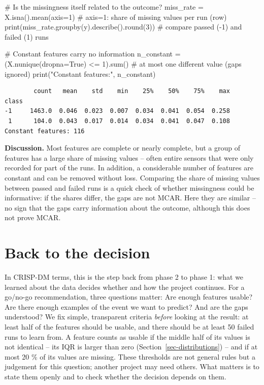 \documentclass[
  letterpaper,
  DIV=11,
  numbers=noendperiod]{scrreprt}
\newenvironment{Shaded}{\begin{snugshade}}{\end{snugshade}}
\newcommand{\BuiltInTok}[1]{\textcolor[rgb]{0.00,0.23,0.31}{#1}}
\newcommand{\CommentTok}[1]{\textcolor[rgb]{0.37,0.37,0.37}{#1}}
\newcommand{\DecValTok}[1]{\textcolor[rgb]{0.68,0.00,0.00}{#1}}
\newcommand{\NormalTok}[1]{\textcolor[rgb]{0.00,0.23,0.31}{#1}}
\newcommand{\OperatorTok}[1]{\textcolor[rgb]{0.37,0.37,0.37}{#1}}
\newcommand{\StringTok}[1]{\textcolor[rgb]{0.13,0.47,0.30}{#1}}
\newcommand{\VariableTok}[1]{\textcolor[rgb]{0.07,0.07,0.07}{#1}}
\begin{document}
\begin{Shaded}
\begin{Highlighting}[]
\CommentTok{\# Is the missingness itself related to the outcome?}
\NormalTok{miss\_rate }\OperatorTok{=}\NormalTok{ X.isna().mean(axis}\OperatorTok{=}\DecValTok{1}\NormalTok{)                  }\CommentTok{\# axis=1: share of missing values per run (row)}
\BuiltInTok{print}\NormalTok{(miss\_rate.groupby(y).describe().}\BuiltInTok{round}\NormalTok{(}\DecValTok{3}\NormalTok{))    }\CommentTok{\# compare passed ({-}1) and failed (1) runs}

\CommentTok{\# Constant features carry no information}
\NormalTok{n\_constant }\OperatorTok{=}\NormalTok{ (X.nunique(dropna}\OperatorTok{=}\VariableTok{True}\NormalTok{) }\OperatorTok{\textless{}=} \DecValTok{1}\NormalTok{).}\BuiltInTok{sum}\NormalTok{()   }\CommentTok{\# at most one different value (gaps ignored)}
\BuiltInTok{print}\NormalTok{(}\StringTok{"Constant features:"}\NormalTok{, n\_constant)}
\end{Highlighting}
\end{Shaded}

\begin{verbatim}
        count   mean    std    min    25%    50%    75%    max
class                                                         
-1     1463.0  0.046  0.023  0.007  0.034  0.041  0.054  0.258
 1      104.0  0.043  0.017  0.014  0.034  0.041  0.047  0.108
Constant features: 116
\end{verbatim}

\textbf{Discussion.} Most features are complete or nearly complete, but
a group of features has a large share of missing values -- often entire
sensors that were only recorded for part of the runs. In addition, a
considerable number of features are constant and can be removed without
loss. Comparing the share of missing values between passed and failed
runs is a quick check of whether missingness could be informative: if
the shares differ, the gaps are not MCAR. Here they are similar -- no
sign that the gaps carry information about the outcome, although this
does not prove MCAR.

\section{Back to the decision}\label{back-to-the-decision-1}

In CRISP-DM terms, this is the step back from phase 2 to phase 1: what
we learned about the data decides whether and how the project continues.
For a go/no-go recommendation, three questions matter: Are enough
features usable? Are there enough examples of the event we want to
predict? And are the gaps understood? We fix simple, transparent
criteria \emph{before} looking at the result: at least half of the
features should be usable, and there should be at least 50 failed runs
to learn from. A feature counts as usable if the middle half of its
values is not identical -- its IQR is larger than zero
(Section~\ref{sec-distributions}) -- and if at most 20 \% of its values
are missing. These thresholds are not general rules but a judgement for
this question; another project may need others. What matters is to state
them openly and to check whether the decision depends on them.
\end{document}
